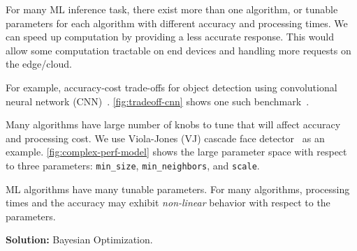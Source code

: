 For many ML inference task, there exist more than one algorithm, or tunable
parameters for each algorithm with different accuracy and processing times.  We
can speed up computation by providing a less accurate response. This would allow
some computation tractable on end devices and handling more requests on the
edge/cloud.

For example, accuracy-cost trade-offs for object detection using convolutional
neural network (CNN)~\cite{huang2016speed}. \autoref{fig:tradeoff-cnn} shows one
such benchmark~\cite{cnn.benchmarks}.

Many algorithms have large number of knobs to tune that will affect accuracy and
processing cost. We use Viola-Jones (VJ) cascade face
detector~\cite{viola2001rapid} as an example. \autoref{fig:complex-perf-model}
shows the large parameter space with respect to three parameters:
\texttt{min\_size}, \texttt{min\_neighbors}, and \texttt{scale}.

ML algorithms have many tunable parameters. For many algorithms, processing
times and the accuracy may exhibit \textit{non-linear} behavior with respect to
the parameters.

\textbf{Solution:} Bayesian Optimization.



